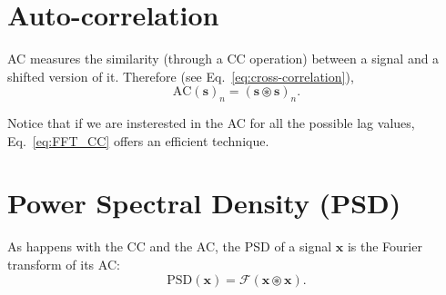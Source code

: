 
\section{Auto-correlation}
\label{sec:auto-correlation}

\gls{AC} measures the similarity (through a \gls{CC} operation)
between a signal and a shifted version of it. Therefore (see
Eq.~\ref{eq:cross-correlation}),
\begin{equation}
  \text{AC}(\mathbf{s})_n = (\mathbf{s}\circledast\mathbf{s})_n.
\end{equation}

Notice that if we are insterested in the \gls{AC} for all the possible
lag values, Eq.~\ref{eq:FFT_CC} offers an efficient technique.





\section{Power Spectral Density (PSD)}
\label{sec:PSD}

As happens with the \gls{CC} and the \gls{AC}, the \gls{PSD} of a
signal $\mathbf{x}$ is the Fourier transform of its \gls{AC}:
\begin{equation}
  \text{PSD}(\mathbf{x}) = \mathcal{F}(\mathbf{x}\circledast\mathbf{x}).
\end{equation}

